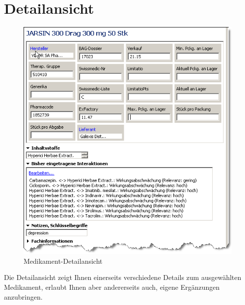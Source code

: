 \documentclass[a4paper]{scrartcl}
\begin{document}
\section{Detailansicht}
\begin{figure}
    \includegraphics{detail1}
    \caption{Medikament-Detailansicht}
    \label {fig:bagdetail}
\end{figure}
Die Detailansicht zeigt Ihnen einerseits verschiedene Details zum ausgewählten Medikament, erlaubt Ihnen aber andererseits auch, eigene Ergänzungen anzubringen.
\end{document}
